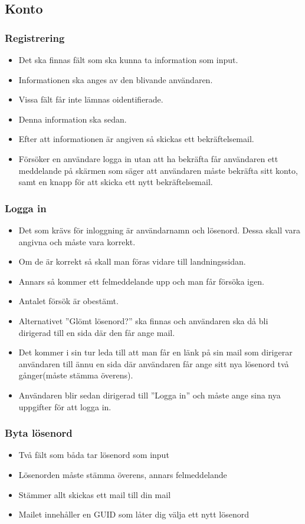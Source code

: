 \documentclass[11pt, titlepage, oneside, a4paper]{article}	%
\begin{document}
\subsection{Konto}
	\subsubsection*{Registrering}
	\begin{itemize}
		\item Det ska finnas fält som ska kunna ta information som input.
		\item Informationen ska anges av den blivande användaren.
		\item Vissa fält får inte lämnas oidentifierade.
		\item Denna information ska sedan.
		\item Efter att informationen är angiven så skickas ett bekräftelsemail.
		\item Försöker en användare logga in utan att ha bekräfta får användaren ett meddelande på skärmen som säger att användaren måste bekräfta sitt konto, samt en knapp för att skicka ett nytt 	bekräftelsemail.
	\end{itemize}
	\subsubsection*{Logga in}
	\begin{itemize}
		\item Det som krävs för inloggning är användarnamn och lösenord. Dessa skall vara angivna och måste vara korrekt. 
		\item Om de är korrekt så skall man föras vidare till landningssidan.
		\item Annars så kommer ett felmeddelande upp och man får försöka igen.
		\item Antalet försök är obestämt.
		\item Alternativet ”Glömt lösenord?” ska finnas och användaren ska då bli dirigerad till en sida där den får ange mail. 
		\item Det kommer i sin tur leda till att man får en länk på sin mail som dirigerar användaren till ännu en sida där användaren får ange sitt nya lösenord två gånger(måste stämma överens).
		\item Användaren blir sedan dirigerad till ”Logga in” och måste ange sina nya uppgifter för att logga in.
	\end{itemize} 

\newpage
	\subsubsection*{Byta lösenord}
	\begin{itemize}
		\item Två fält som båda tar lösenord som input
		\item Lösenorden måste stämma överens, annars felmeddelande
		\item Stämmer allt skickas ett mail till din mail
		\item Mailet innehåller en GUID som låter dig välja ett nytt lösenord
	\end{itemize} 
\end{document}
